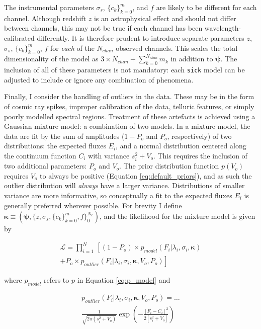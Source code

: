 \documentclass[iop]{emulateapj}
\newcommand{\sick}{\texttt{sick}}
\begin{document}
The instrumental parameters $\sigma_{s}$, $\{c_k\}_{k=0}^{m}$, and $f$ are likely 
to be different for each channel. Although redshift $z$ is an astrophysical effect 
and should not differ between channels, this may not be true if each channel has 
been wavelength-calibrated differently. It is therefore prudent to introduce 
separate parameters $z$, $\sigma_{s}$, $\{c_k\}_{k=0}^{m}$, $f$ for \textit{each} 
of the $N_{chan}$ observed channels. This scales the total dimensionality of the 
model as $3\times{}N_{chan} + \sum_{k=0}^{N_{chan}}m_{k}$ in addition to $\bm{\psi}$. 
The inclusion of all of these parameters is not mandatory: each \sick{} model can 
be adjusted to include or ignore any combination of phenomena. 

Finally, I consider the handling of outliers in the data. These may be in the form 
of cosmic ray spikes, improper calibration of the data, telluric features, or simply 
poorly modelled spectral regions. Treatment of these artefacts is achieved using a 
Gaussian mixture model: a combination of two models. In a mixture model, the data 
are fit by the sum of amplitudes ($1 - P_o$ and $P_o$, respectively) of two 
distributions: the expected fluxes $E_i$, and a normal distribution centered along 
the continuum function $C_i$ with variance $s_{i}^2 + V_{o}$. This requires the 
inclusion of two  additional parameters: $P_o$ and $V_o$. The prior 
distribution function $p\left(V_o\right)$ requires $V_{o}$ to always be positive 
(Equation \ref{eq:default_priors}), and as such the outlier distribution will 
\textit{always} have a larger variance. Distributions of smaller variance are more 
informative, so conceptually a fit to the expected fluxes $E_{i}$ is generally 
preferred wherever possible. For brevity I define $\bm{\kappa} \equiv (\bm{\psi},\{z,\sigma_s,\{c_k\}_{k=0}^{m},f\}_{0}^{N_{c}})$, and the likelihood for the mixture model is given by
 
 \begin{multline}
\mathcal{L} = \prod_{i=1}^{N}\,\left[\left(1 - P_{o}\right)\times{}p_{model}\left(F_i|\lambda_i,\sigma_{i},\bm{\kappa}\right)\right. \\
+ \left. P_{o}\times{}p_{outlier}\left(F_i|\lambda_i,\sigma_i,\bm{\kappa},V_{o},P_o\right)\right]
\end{multline}
 
\noindent{}where $p_{model}$ refers to $p$ in Equation \ref{eq:p_model} and 

\begin{multline}
p_{outlier}\left(F_i|\lambda_i,\sigma_i,\bm{\kappa},V_{o},P_o\right) = \dots \\
  \frac{1}{\sqrt{2\pi\left(s_{i}^2 + V_{o}\right)}} \exp\left(-\frac{[F_i - C_i]^2}{2\left[s_{i}^2 + V_{o}\right]}\right)
\end{multline}
\end{document}
